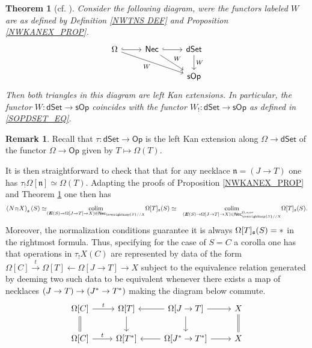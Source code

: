 \documentclass[a4paper,10pt]{article}%
\numberwithin{equation}{section}
\numberwithin{figure}{section}
\newtheorem{theorem}[equation]{Theorem}%
\theoremstyle{definition} %
\newtheorem{remark}[equation]{Remark}%
\newcommand{\vect}[1]{\text{\overrightharp{\ensuremath{#1}}}}
\DeclareMathOperator{\colim}{colim}%
\newcommand{\1}{\ensuremath{\mathbbm 1}}%
\begin{document}
\begin{theorem}[{cf. \cite[Thm. 1.3]{DS11}}]
	\label{KANEXTCHAR THM}
	Consider the following diagram,
	were the functors labeled $W$ 
	are as defined by Definition \ref{NWTNS DEF}
	and Proposition \ref{NWKANEX_PROP}.
\begin{equation}
\begin{tikzcd}
	\Omega \ar[hookrightarrow]{r}
	\ar{rrd}[swap]{W} 
&
	\mathsf{Nec}
	\ar[hookrightarrow]{r}
	\ar{rd}{W}
&
	\mathsf{dSet}
	\ar{d}{W}
\\
&&
	\mathsf{sOp} 
\end{tikzcd}
\end{equation}
Then both triangles in this diagram are left Kan extensions.
%
In particular, the functor
$W \colon \mathsf{dSet} \to \mathsf{sOp}$
coincides with the functor
$W_! \colon \mathsf{dSet} \to \mathsf{sOp}$
as defined in \eqref{SOPDSET_EQ}.
\end{theorem}



\begin{remark}\label{TAUFUNEX REM}
	Recall that
	$\tau \colon \mathsf{dSet} \to \mathsf{Op}$
	is the left Kan extension along
	$\Omega \to \mathsf{dSet}$
	of the functor
	$\Omega \to \mathsf{Op}$
	given by $T \mapsto \Omega(T)$.
	
	It is then straightforward to check that
	that for any necklace
	$\mathfrak{n} = (J \to T)$
	one has 
	$\tau_! \Omega[\mathfrak{n}] \simeq \Omega(T)$.
	Adapting the proofs of 
	Proposition \ref{NWKANEX_PROP} and
	Theorem \ref{KANEXTCHAR THM} one then has
\begin{equation}
\begin{aligned}
	\left(N \tau_!X\right)_{\mathfrak{s}}(S) 
	\simeq &
\underset{(\boldsymbol{E}(S) \to 
	\Omega[J \to T] \to X)
	\in \mathsf{Nec}_{\vect{S}//X}}{\colim}
	\Omega[T]_{\mathfrak{s}}(S)
	\simeq &
\underset{(\boldsymbol{E}(S) \to 
	\Omega[J \to T] \to X)
	\in \mathsf{Nec}^{\Omega,nor}_{\vect{S}//X}}{\colim}
	\Omega[T]_{\mathfrak{s}}(S).
\end{aligned}
\end{equation}
Moreover, the normalization conditions guarantee
it is always 
$\Omega[T]_{\mathfrak{s}}(S) = \**$
in the rightmost formula.
Thus, specifying for the case of
$S=C$ a corolla one has that operations in
$\tau_!X(C)$
are represented by 
data of the form
$
	\Omega[C]
	\xrightarrow{t}
	\Omega[T]
	\leftarrow
	\Omega[J \to T]
	\to X
$
subject to the equivalence relation
generated by deeming two such data to be equivalent whenever there exists a map of necklaces
$(J \to T) \to (J^{\**} \to T^{\**})$
making the diagram below commute.
\[
\begin{tikzcd}
	\Omega[C] \ar{r}{t} \ar[equal]{d} &
	\Omega[T] \ar{d} &
	\Omega[J \to T] \ar{l} \ar{r} \ar{d} &
	X \ar[equal]{d}
\\
	\Omega[C] \ar{r}{t} &
	\Omega[T^{\**}] &
	\Omega[J^{\**} \to T^{\**}] \ar{l} \ar{r} &
	X
\end{tikzcd}
\]
\end{remark}
\end{document}
